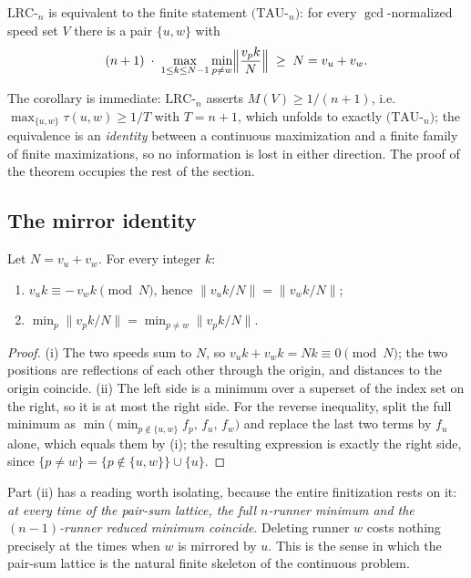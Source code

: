 \begin{corollary}\label{cor:tau}
$\mathrm{LRC}$-$_n$ is equivalent to the finite statement
$(\mathrm{TAU}$-$_n)$: for every $\gcd$-normalized speed set $V$ there is
a pair $\{u,w\}$ with
\[
(n+1)\;\cdot\;\max_{1\le k\le N-1}\min_{p\ne w}
\Bigl\lVert \frac{v_p k}{N}\Bigr\rVert \;\ge\; N=v_u+v_w .
\]
\end{corollary}

The corollary is immediate: $\mathrm{LRC}$-$_n$ asserts $M(V)\ge
1/(n{+}1)$, i.e.\ $\max_{\{u,w\}}\tau(u,w)\ge 1/T$ with $T=n{+}1$, which
unfolds to exactly $(\mathrm{TAU}$-$_n)$; the equivalence is an
\emph{identity} between a continuous maximization and a finite family of
finite maximizations, so no information is lost in either direction. The
proof of the theorem occupies the rest of the section.

\subsection{The mirror identity}

\begin{lemma}\label{lem:mirror}
Let $N=v_u+v_w$. For every integer $k$:
\begin{enumerate}[leftmargin=1.8em,itemsep=1pt]
\item[(i)] $v_u k\equiv -\,v_w k \pmod N$, hence
  $\lVert v_u k/N\rVert=\lVert v_w k/N\rVert$;
\item[(ii)] $\min_{p}\lVert v_p k/N\rVert
  =\min_{p\ne w}\lVert v_p k/N\rVert$.
\end{enumerate}
\end{lemma}

\begin{proof}
(i) The two speeds sum to $N$, so
$v_u k+v_w k=Nk\equiv 0 \pmod N$; the two positions are reflections of
each other through the origin, and distances to the origin coincide.
(ii) The left side is a minimum over a superset of the index set on the
right, so it is at most the right side. For the reverse inequality,
split the full minimum as
$\min\bigl(\min_{p\notin\{u,w\}} f_p,\,f_u,\,f_w\bigr)$ and replace the
last two terms by $f_u$ alone, which equals them by (i); the resulting
expression is exactly the right side, since
$\{p\ne w\}=\{p\notin\{u,w\}\}\cup\{u\}$.
\end{proof}

Part (ii) has a reading worth isolating, because the entire finitization
rests on it: \emph{at every time of the pair-sum lattice, the full
$n$-runner minimum and the $(n{-}1)$-runner reduced minimum coincide}.
Deleting runner $w$ costs nothing precisely at the times when $w$ is
mirrored by $u$. This is the sense in which the pair-sum lattice is the
natural finite skeleton of the continuous problem.

